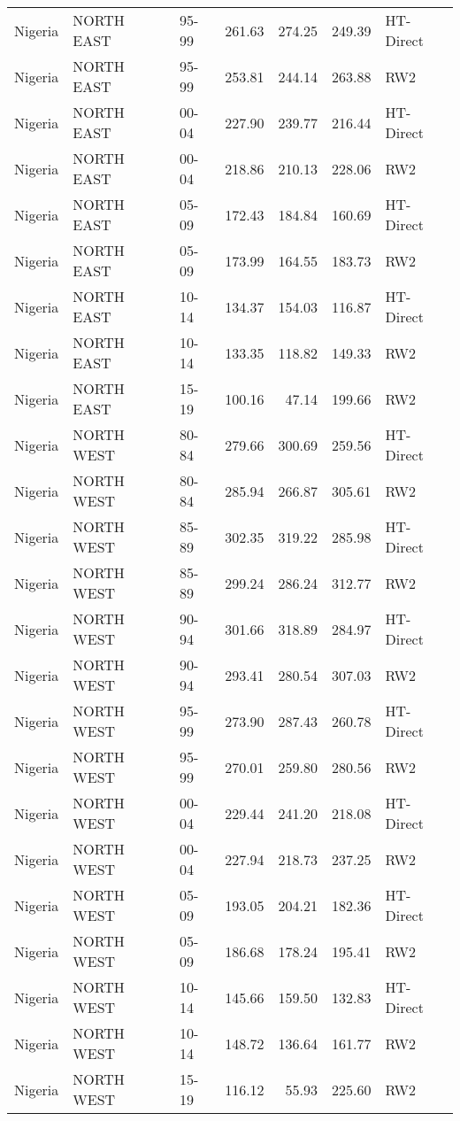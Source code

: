 \begin{longtable}{lllrrrl}
  Nigeria & NORTH EAST & 95-99 & 261.63 & 274.25 & 249.39 & HT-Direct \\ 
  Nigeria & NORTH EAST & 95-99 & 253.81 & 244.14 & 263.88 & RW2 \\ 
  Nigeria & NORTH EAST & 00-04 & 227.90 & 239.77 & 216.44 & HT-Direct \\ 
  Nigeria & NORTH EAST & 00-04 & 218.86 & 210.13 & 228.06 & RW2 \\ 
  Nigeria & NORTH EAST & 05-09 & 172.43 & 184.84 & 160.69 & HT-Direct \\ 
  Nigeria & NORTH EAST & 05-09 & 173.99 & 164.55 & 183.73 & RW2 \\ 
  Nigeria & NORTH EAST & 10-14 & 134.37 & 154.03 & 116.87 & HT-Direct \\ 
  Nigeria & NORTH EAST & 10-14 & 133.35 & 118.82 & 149.33 & RW2 \\ 
  Nigeria & NORTH EAST & 15-19 & 100.16 & 47.14 & 199.66 & RW2 \\ 
  Nigeria & NORTH WEST & 80-84 & 279.66 & 300.69 & 259.56 & HT-Direct \\ 
  Nigeria & NORTH WEST & 80-84 & 285.94 & 266.87 & 305.61 & RW2 \\ 
  Nigeria & NORTH WEST & 85-89 & 302.35 & 319.22 & 285.98 & HT-Direct \\ 
  Nigeria & NORTH WEST & 85-89 & 299.24 & 286.24 & 312.77 & RW2 \\ 
  Nigeria & NORTH WEST & 90-94 & 301.66 & 318.89 & 284.97 & HT-Direct \\ 
  Nigeria & NORTH WEST & 90-94 & 293.41 & 280.54 & 307.03 & RW2 \\ 
  Nigeria & NORTH WEST & 95-99 & 273.90 & 287.43 & 260.78 & HT-Direct \\ 
  Nigeria & NORTH WEST & 95-99 & 270.01 & 259.80 & 280.56 & RW2 \\ 
  Nigeria & NORTH WEST & 00-04 & 229.44 & 241.20 & 218.08 & HT-Direct \\ 
  Nigeria & NORTH WEST & 00-04 & 227.94 & 218.73 & 237.25 & RW2 \\ 
  Nigeria & NORTH WEST & 05-09 & 193.05 & 204.21 & 182.36 & HT-Direct \\ 
  Nigeria & NORTH WEST & 05-09 & 186.68 & 178.24 & 195.41 & RW2 \\ 
  Nigeria & NORTH WEST & 10-14 & 145.66 & 159.50 & 132.83 & HT-Direct \\ 
  Nigeria & NORTH WEST & 10-14 & 148.72 & 136.64 & 161.77 & RW2 \\ 
  Nigeria & NORTH WEST & 15-19 & 116.12 & 55.93 & 225.60 & RW2 \\ 

\end{longtable}
